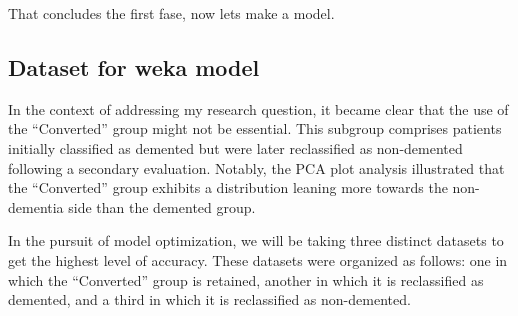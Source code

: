 \documentclass[
]{article}
\newenvironment{Shaded}{\begin{snugshade}}{\end{snugshade}}
\newcommand{\CommentTok}[1]{\textcolor[rgb]{0.56,0.35,0.01}{\textit{#1}}}
\newcommand{\FunctionTok}[1]{\textcolor[rgb]{0.00,0.00,0.00}{#1}}
\newcommand{\NormalTok}[1]{#1}
\newcommand{\OtherTok}[1]{\textcolor[rgb]{0.56,0.35,0.01}{#1}}
\newcommand{\SpecialCharTok}[1]{\textcolor[rgb]{0.00,0.00,0.00}{#1}}
\newcommand{\StringTok}[1]{\textcolor[rgb]{0.31,0.60,0.02}{#1}}
\begin{document}
That concludes the first fase, now lets make a model.

\hypertarget{dataset-for-weka-model}{%
\subsection{Dataset for weka model}\label{dataset-for-weka-model}}

In the context of addressing my research question, it became clear that
the use of the ``Converted'' group might not be essential. This subgroup
comprises patients initially classified as demented but were later
reclassified as non-demented following a secondary evaluation. Notably,
the PCA plot analysis illustrated that the ``Converted'' group exhibits
a distribution leaning more towards the non-dementia side than the
demented group.

In the pursuit of model optimization, we will be taking three distinct
datasets to get the highest level of accuracy. These datasets were
organized as follows: one in which the ``Converted'' group is retained,
another in which it is reclassified as demented, and a third in which it
is reclassified as non-demented.

\begin{Shaded}
\end{Shaded}
\end{document}
